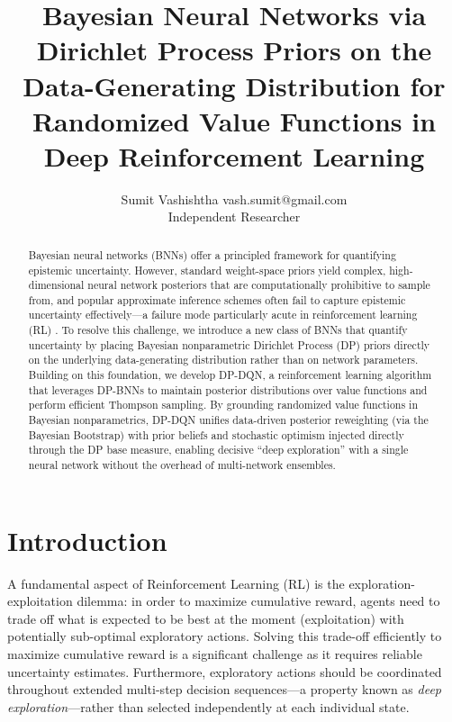 \documentclass[10pt]{article}
\title{Bayesian Neural Networks via Dirichlet Process Priors on the Data-Generating Distribution for Randomized Value Functions in Deep Reinforcement Learning}
\author{\name Sumit Vashishtha \email vash.sumit@gmail.com \\
      \addr Independent Researcher
    }
\begin{document}
{\maketitle} %

\begin{abstract}
Bayesian neural networks (BNNs) offer a principled framework for quantifying epistemic uncertainty. However, standard weight-space priors yield complex, high-dimensional neural network posteriors that are computationally prohibitive to sample from, and popular approximate inference schemes often fail to capture epistemic uncertainty effectively---a failure mode particularly acute in reinforcement learning (RL) \citep{osband2018randomized}. To resolve this challenge, we introduce a new class of BNNs that quantify uncertainty by placing Bayesian nonparametric Dirichlet Process (DP) priors directly on the underlying data-generating distribution rather than on network parameters. Building on this foundation, we develop DP-DQN, a reinforcement learning algorithm that leverages DP-BNNs to maintain posterior distributions over value functions and perform efficient Thompson sampling. By grounding randomized value functions in Bayesian nonparametrics, DP-DQN unifies data-driven posterior reweighting (via the Bayesian Bootstrap) with prior beliefs and stochastic optimism injected directly through the DP base measure, enabling decisive ``deep exploration'' with a single neural network without the overhead of multi-network ensembles.
\end{abstract}



\section{Introduction}

A fundamental aspect of Reinforcement Learning (RL) is the exploration-exploitation dilemma: in order to maximize cumulative reward, agents need to trade off what is expected to be best at the moment (exploitation) with potentially sub-optimal exploratory actions. Solving this trade-off efficiently to maximize cumulative reward is a significant challenge as it requires reliable uncertainty estimates. Furthermore, exploratory actions should be coordinated throughout extended multi-step decision sequences---a property known as \emph{deep exploration}---rather than selected independently at each individual state.
\end{document}
